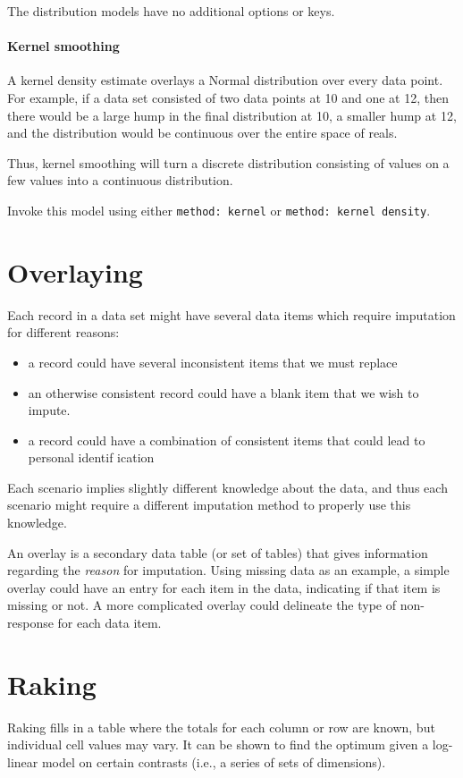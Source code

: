 \documentclass{article}
\begin{document}
The distribution models have no additional options or keys.

\paragraph{Kernel smoothing} A kernel density estimate overlays a Normal distribution over
every data point. For example, if a data set consisted of two data points at 10 and one at
12, then there would be a large hump in the final distribution at 10, a smaller hump at
12, and the distribution would be continuous over the entire space of reals.

Thus, kernel smoothing will turn a discrete distribution consisting of values on a
few values into a continuous distribution.

Invoke this model using either {\tt method: kernel} or {\tt method: kernel density}.

\section{Overlaying}
Each record in a data set might have several data items which require imputation for
different reasons:
\begin{itemize}
\item a record could have several inconsistent items that we must replace
\item an otherwise consistent record could have a blank item that we wish to impute.
\item a record could have a combination of consistent items that could lead to personal identif
ication
\end{itemize}
Each scenario implies slightly different knowledge about the data, and thus each scenario
might require a different imputation method to properly use this knowledge.

An overlay is a secondary data table (or set of tables) that gives information regarding
the \emph{reason} for imputation.  Using missing data as an example, a simple overlay
could have an entry for each item in the data, indicating if that item is missing or not.
A more complicated overlay could delineate the type of non-response for each data item.


\section{Raking}
Raking fills in a table where the totals for each column or row are known, but
individual cell values may vary. It can be shown to find the optimum given a
log-linear model on certain contrasts (i.e., a series of sets of dimensions).
\end{document}
